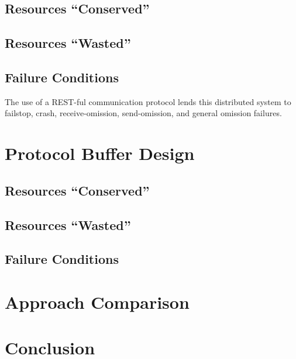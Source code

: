 \documentclass[11pt]{article} %
\begin{document}
\subsection{Resources ``Conserved''} 

\subsection{Resources ``Wasted''}

\subsection{Failure Conditions}

The use of a REST-ful communication protocol lends this distributed system to failstop, crash, receive-omission, send-omission, and general omission failures. 

\section{Protocol Buffer Design}

\subsection{Resources ``Conserved''} 

\subsection{Resources ``Wasted''}

\subsection{Failure Conditions}

\section{Approach Comparison} 

\section{Conclusion} 
\end{document}
